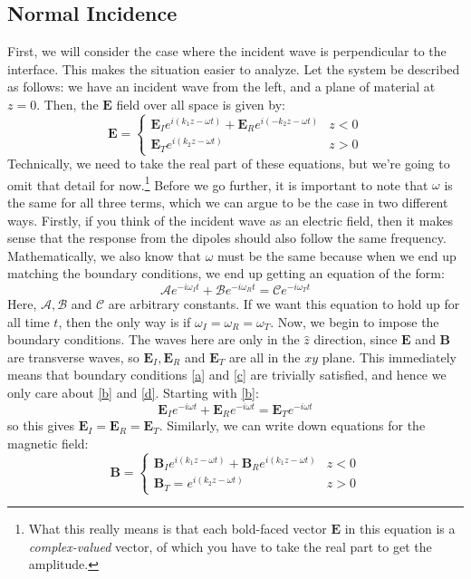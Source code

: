 \subsection{Normal Incidence}
First, we will consider the case where the incident wave is perpendicular to the interface. This makes the
situation easier to analyze. Let the system be described as follows: we have an incident wave from the left,
and a plane of material at \( z = 0 \). Then, the \( \mathbf{E} \) field over all space is given by:
\[
	\mathbf{E} = \begin{cases}
		\mathbf{E}_I e^{i (k_1 z - \omega t )} + \mathbf{E}_R e^{i(-k_2 z - \omega t)} & z < 0\\
		\mathbf{E}_T e^{i (k_2 z - \omega t)} & z > 0
	\end{cases}
\]
Technically, we need to take the real part of these equations, but we're going to omit that detail for
now.\footnote{What this really means is that each bold-faced vector \( \mathbf{E} \) in this equation is a
\textit{complex-valued} vector, of which you have to take the real part to get the amplitude.}  
Before we go further, it is important to note that \( \omega \) is the same for all three terms, which we can
argue to be the case in two different ways. Firstly, if you think of the incident wave as an electric field,
then it makes sense that the response from the dipoles should also follow the same frequency. Mathematically,
we also know that \( \omega \) must be the same because when we end up matching the boundary conditions, we
end up getting an equation of the form:
\[
	\mathcal{A}e^{- i \omega_I t} + \mathcal{B} e^{-i \omega_R t} = \mathcal{C}e^{- i \omega_T t}
\]
Here, \( \mathcal{A}, \mathcal{B} \) and \( \mathcal{C} \) are arbitrary constants. 
If we want this equation to hold up for all time \( t \), then the only way is if \( \omega_I = \omega_R =
\omega_T \). Now, we begin to impose the boundary conditions. The waves here are only in the \( \hat{z} \)
direction, since \( \mathbf{E} \) and \( \mathbf{B} \) are transverse waves, so \( \mathbf{E}_I, \mathbf{E}_R
\) and \( \mathbf{E}_T  \) are all in the \( xy \) plane. This immediately means that boundary conditions
\ref{a} and \ref{c} are trivially satisfied, and hence we only care about \ref{b} and \ref{d}. Starting with
\ref{b}:
\[
	\mathbf{E}_I e^{-i \omega t} + \mathbf{E}_R e^{-i \omega t} = \mathbf{E}_T e^{- i \omega t}
\]
so this gives \( \mathbf{E}_I = \mathbf{E}_R = \mathbf{E}_T \). Similarly, we can write down equations for the
magnetic field:
\[
	\mathbf{B} = \begin{cases}
		\mathbf{B}_I e^{i (k_1z - \omega t)} + \mathbf{B}_R e^{i(k_1 z - \omega t)} & z < 0 \\
		\mathbf{B}_T = e^{i(k_2 z - \omega t)} & z > 0
	\end{cases}
\]
